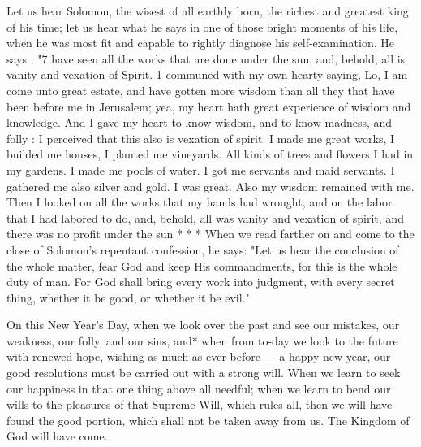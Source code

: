 Let us hear Solomon, the wisest of all earthly 
born, the richest and greatest king of his time; 
let us hear what he says in one of those bright 
moments of his life, when he was most fit and 
capable to rightly diagnose his self-examination. 
He says : "7 have seen all the works that are 
done under the sun; and, behold, all is vanity 
and vexation of Spirit. 1 communed with my 
own hearty saying, Lo, I am come unto great 
estate, and have gotten more wisdom than all 
they that have been before me in Jerusalem; 
yea, my heart hath great experience of wisdom 
and knowledge. And I gave my heart to know 
wisdom, and to know madness, and folly : I perceived
that this also is vexation of spirit. I 
made me great works, I builded me houses, I 
planted me vineyards. All kinds of trees and 
flowers I had in my gardens. I made me pools 
of water. I got me servants and maid servants. 
I gathered me also silver and gold. I was 
great. Also my wisdom remained with me. 
Then I looked on all the works that my hands 
had wrought, and on the labor that I had 
labored to do, and, behold, all was vanity and 
vexation of spirit, and there was no profit 
under the sun * * * When we read farther 
on and come to the close of Solomon's repentant
confession, he says: "Let us hear the conclusion
of the whole matter, fear God and keep 
His commandments, for this is the whole duty 
of man. For God shall bring every work into 
judgment, with every secret thing, whether it be 
good, or whether it be evil." 

On this New Year's Day, when we look over 
the past and see our mistakes, our weakness, 
our folly, and our sins, and* when from to-day 
we look to the future with renewed hope, wishing
as much as ever before — a happy new 
year, our good resolutions must be carried out 
with a strong will. When we learn to seek our
happiness in that one thing above all needful; 
when we learn to bend our wills to the pleasures 
of that Supreme Will, which rules all, then we 
will have found the good portion, which shall 
not be taken away from us. The Kingdom of 
God will have come. 

